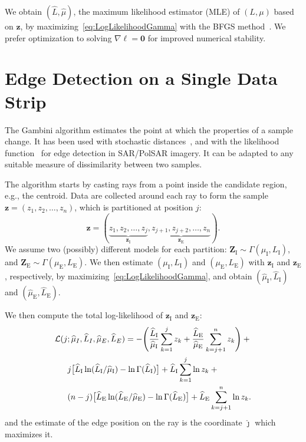 \documentclass[journal]{IEEEtran}
\begin{document}
We obtain $(\widehat L, \widehat \mu)$, the maximum likelihood estimator (MLE) of $(L, \mu)$ based on $\bm z$, by maximizing~\eqref{eq:LogLikelihoodGamma} with the BFGS method~\cite{ht}.
We prefer optimization to solving $\nabla\ell=\bm 0$ for improved numerical stability.

\section{Edge Detection on a Single Data Strip}\label{sec_03}

The Gambini algorithm estimates the point at which the properties of a sample change.
It has been used with stochastic distances~\cite{nhfc}, and with the likelihood function~\cite{gmbf, fbgm} for edge detection in SAR/PolSAR imagery.
It can be adapted to any suitable measure of dissimilarity between two samples.

The algorithm starts by casting rays from a point inside the candidate region, e.g., the centroid.
Data are collected around each ray to form the sample $\bm z = (z_1,z_2,\dots,z_n)$, which is partitioned at position $j$:
$$
\bm z = (\underbrace{z_1,z_2,\dots,z_j}_{\bm z_\text{I}}, 
\underbrace{z_{j+1}, z_{j+2},\dots,z_n}_{\bm z_\text{E}}).
$$
We assume two (possibly) different models for each partition:
$\bm Z_\text{I} \sim \Gamma(\mu_\text{I},L_\text{I})$, and 
$\bm Z_\text{E} \sim \Gamma(\mu_\text{E},L_\text{E})$.
We then estimate $(\mu_\text{I},L_\text{I})$ and $(\mu_\text{E},L_\text{E})$ with $\bm z_\text{I}$ and $\bm z_\text{E}$, respectively, by maximizing~\eqref{eq:LogLikelihoodGamma}, and obtain $(\widehat{\mu}_\text{I}, \widehat{L}_\text{I})$ and $(\widehat{\mu}_\text{E}, \widehat{L}_\text{E})$.

We then compute the total log-likelihood of $\bm z_\text{I}$ and $\bm z_\text{E}$:
\begin{equation}\label{eq:TotalLogLikelihood}
\begin{aligned}
\mathcal L(j&;\widehat{\mu}_I, \widehat{L}_I,\widehat{\mu}_E, \widehat{L}_E)= -\Bigg(
	\frac{\widehat{L}_\text{I}}{\widehat{\mu}_\text{I}}\sum_{k=1}^{j} z_k +
	\frac{\widehat{L}_\text{E}}{\widehat{\mu}_\text{E}}\sum_{k=j+1}^{n} z_k  
	\Bigg)+\mbox{}\\
&j \big[\widehat{L}_\text{I}\ln (\widehat{L}_\text{I} / \widehat{\mu}_\text{I}) - \ln \Gamma(\widehat{L}_\text{I})\big]
+\widehat{L}_\text{I} \sum_{k=1}^{j}\ln z_k + \mbox{}\\
&(n-j) \big[\widehat{L}_\text{E}\ln (\widehat{L}_\text{E} / \widehat{\mu}_\text{E}) - \ln \Gamma(\widehat{L}_\text{E})\big]
+\widehat{L}_\text{E} \sum_{k=j+1}^{n}\ln z_k .%
\raisetag{2.2em}
\end{aligned}
\end{equation}
and the estimate of the edge position on the ray is the coordinate $\widehat\jmath$ which maximizes it.
\end{document}
